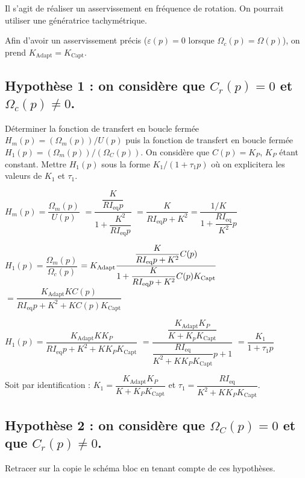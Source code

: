 \ifprof
\begin{corrige}
Il s'agit de réaliser un asservissement en fréquence de rotation. On pourrait utiliser une génératrice tachymétrique. 

Afin d'avoir un asservissement précis ($\varepsilon(p)=0$ lorsque $\Omega_c(p)=\Omega(p)$), on prend $K_{\text{Adapt}}=K_{\text{Capt}}$.
\end{corrige}
\else
\fi


\ifprof

\subsection*{Hypothèse 1 : on considère que $C_r (p)=0$ et $\Omega_c (p)\neq 0$.}
\begin{question}
Déterminer la fonction de transfert en boucle fermée $H_m (p)=(\Omega_m (p))/U(p)$ puis la fonction de transfert en boucle fermée $H_1 (p)=(\Omega_m (p))/(\Omega_C (p))$. On considère que $C(p)=K_P$, $K_P$ étant constant. Mettre $H_1 (p)$ sous la forme $K_1/(1+\tau_1 p)$ où on explicitera les valeurs de $K_1$ et $\tau_1$.
\end{question}

\ifprof
\begin{corrige}
$H_m (p)=\dfrac{\Omega_m (p)}{U(p)} $
$= \dfrac{\dfrac{K}{RI_{\text{eq}}p}}{1+\dfrac{K^2}{ RI_{\text{eq}}p}}$
$=\dfrac{K}{R I_{\text{eq}} p+K^2  }=\dfrac{1/K}{1+\dfrac{RI_{\text{eq}}}{K^2}p}$


$H_1 (p)=\dfrac{\Omega_m (p)}{\Omega_c (p)} $
$=K_{\text{Adapt}} \dfrac{\dfrac{K}{R I_{\text{eq}} p+K^2 } C(p)}{%
1+\dfrac{K}{R I_{\text{eq}} p+K^2 } C(p) K_{\text{Capt}} }$
$=\dfrac{K_{\text{Adapt}} K C(p)}{R I_{\text{eq}} p+K^2+K C(p) K_{\text{Capt}} }$


$H_1 (p)=\dfrac{K_{\text{Adapt}} K K_P}{R I_{\text{eq}} p+K^2+K K_P K_{\text{Capt}}}$
$=\dfrac{\dfrac{K_{\text{Adapt}} K_P}{K+K_p K_{\text{Capt}}}}{\dfrac{R I_{\text{eq}}}{K^2+K K_P K_{\text{Capt}}} p+1}$
$=\dfrac{K_1}{1+\tau_1 p}$


Soit par identification : $K_1=\dfrac{K_{\text{Adapt}} K_P}{K+K_P K_{\text{Capt}}}$	et	$\tau_1=\dfrac{R I_{\text{eq}}}{K^2+K K_P K_{\text{Capt}}}$.




\end{corrige}
\else

\fi






\subsection*{Hypothèse 2 : on considère que $\Omega_C (p)=0$ et que $C_r (p)\neq0$.}
\begin{question}
Retracer sur la copie le schéma bloc en tenant compte de ces hypothèses.
\end{question}

